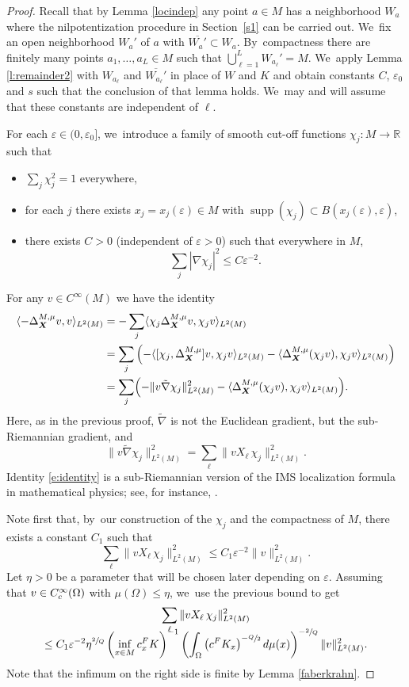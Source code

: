 \documentclass[11pt]{article}
\let\oldsfrac\sfrac
\renewcommand{\sfrac}[2]{{\oldsfrac{#1}{#2}}}
\newcommand{\rc}{\textup{c}}
\newcommand{\FK}{\textup{FK}}
\newcommand{\bX}{{\boldsymbol{X}}}
\theoremstyle{definition}
\let\epsilon\varepsilon
\let\Xb\bX
\newcommand{\1}{\mathbbm{1}}
\newcommand{\R}{\mathbb{R}}
\DeclareMathOperator{\supp}{supp}
\numberwithin{equation}{section}
\begin{document}
\begin{proof}
Recall that by Lemma \ref{locindep} any point $a\in M$ has a neighborhood $W_a$ where the nilpotentization procedure in Section~\ref{s1} can be carried out. We~fix an open neighborhood $W_a'$ of $a$ with $\overline{W_a'}\subset W_a$. By~compactness there are finitely many points $a_1,\ldots,a_L\in M$ such that $\bigcup_{\ell=1}^L W_{a_\ell}' = M$. We~apply Lemma \ref{l:remainder2} with $W_{a_\ell}$ and $\overline{W_{a_\ell} '}$ in place of $W$ and $K$ and obtain constants $C$, $\epsilon_0$ and $s$ such that the conclusion of that lemma holds. We~may and will assume that these constants are independent of $\ell$.

For each $\varepsilon\in(0,\epsilon_0]$, we~introduce a family of smooth cut-off functions $\chi_j:M\to \R$ such that
\begin{itemize}
\item $\sum_j \chi_j^2= 1$ everywhere,
\item for each $j$ there exists $x_j = x_j(\epsilon)\in M$ with $\supp (\chi_j) \subset B(x_j(\epsilon),\epsilon)$,
\item there exists $C>0$ (independent of $\varepsilon>0$) such that everywhere in $M$,
\[
\sum_j |\nabla \chi_j|^2 \leq C \varepsilon^{-2}.
\]
\end{itemize}
For any $v\in C^\infty(M)$ we have the identity
\begin{align}\label{e:identity}
\langle -\Delta^{M,\mu}_\Xb v,v\rangle_{L^2(M)} & = - \sum_j \langle \chi_j \Delta^{M,\mu}_\Xb v,\chi_j v \rangle_{L^2(M)} \nonumber \\
&= \sum_j \left(- \langle [\chi_j,\Delta^{M,\mu}_\Xb]v,\chi_jv \rangle_{L^2(M)} - \langle \Delta^{M,\mu}_\Xb (\chi_jv), \chi_j v\rangle_{L^2(M)}\right) \nonumber \\
&=\sum_j \Bigl(- \| v \tilde \nabla\chi_j \|_{L^2(M)}^2 - \langle \Delta^{M,\mu}_\Xb (\chi_j v),\chi_j v \rangle_{L^2(M)} \Bigr).
\end{align}
Here, as in the previous proof, $\tilde \nabla$ is not the Euclidean gradient, but the sub-Riemannian gradient, and
\[
\| v\tilde \nabla\chi_j \|_{L^2(M)}^2 = \sum_{\ell} \| v X_\ell \,\chi_j \|_{L^2(M)}^2.
\]
Identity \eqref{e:identity} is a sub-Riemannian version of the IMS localization formula in mathematical physics; see, for instance, \cite[\S 3.1]{CyFrKiSi}.

Note first that, by~our construction of the $\chi_j$ and the compactness of $M$, there exists a constant $C_1$ such that
\[
\sum_{\ell} \| v X_\ell \,\chi_j \|_{L^2(M)}^2 \leq C_1 \epsilon^{-2} \|v\|_{L^2(M)}^2.
\]
Let $\eta>0$ be a parameter that will be chosen later depending on $\epsilon$. Assuming that $v\in C^\infty_\rc(\Omega)$ with $\mu(\Omega)\leq\eta$, we~use the previous bound to get
\begin{multline}
\label{eq:remainder1}
\sum_{\ell} \| v X_\ell \,\chi_j \|_{L^2(M)}^2\\[-8pt]
\leq C_1 \epsilon^{-2}
\eta^{\sfrac2Q} \left(\inf_{x\in M} c_x^\FK\right)^{-1}
\left(\int_\Omega \left(c^\FK_x\right)^{-\sfrac Q2} d\mu(x)\right)^{-\sfrac 2Q}
\|v\|_{L^2(M)}^2.
\end{multline}
Note that the infimum on the right side is finite by Lemma \ref{faberkrahn}.


\end{proof}
\end{document}
